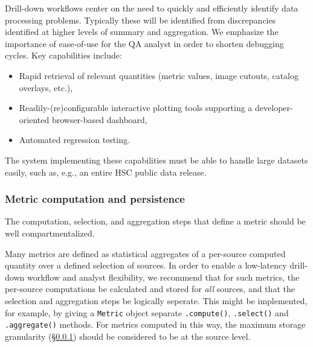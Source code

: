 

Drill-down workflows center on the need to quickly and efficiently identify data processing problems.
Typically these will be identified from discrepancies identified at higher levels of summary and aggregation.
We emphasize the importance of ease-of-use for the QA analyst in order to shorten debugging cycles.
Key capabilities include:

\begin{itemize}
	\item Rapid retrieval of relevant quantities (metric values, image cutouts, catalog overlays, etc.),
	\item Readily-(re)configurable interactive plotting tools supporting a developer-oriented browser-based dashboard,
	\item Automated regression testing.
\end{itemize}

The system implementing these capabilities must be able to handle large datasets easily, such as, e.g., an entire HSC public data release.

\subsubsection{Metric computation and persistence} \label{sec:metric_storage}

\begin{recommendation} \label{sec:metric_computation}
The computation, selection, and aggregation steps that define a metric should be well compartmentalized.
\end{recommendation}

Many metrics are defined as statistical aggregates of a per-source computed quantity over a defined selection of sources.
In order to enable a low-latency drill-down workflow and analyst flexibility, we recommend that for such metrics, the per-source computations be calculated and stored for \emph{all} sources, and that the selection and aggregation steps be logically seperate.
This might be implemented, for example, by giving a \texttt{Metric} object separate \texttt{.compute()}, \texttt{.select()} and \texttt{.aggregate()} methods.
For metrics computed in this way, the maximum storage granularity (\S \ref{sec:metric_storage}) should be considered to be at the source level.

